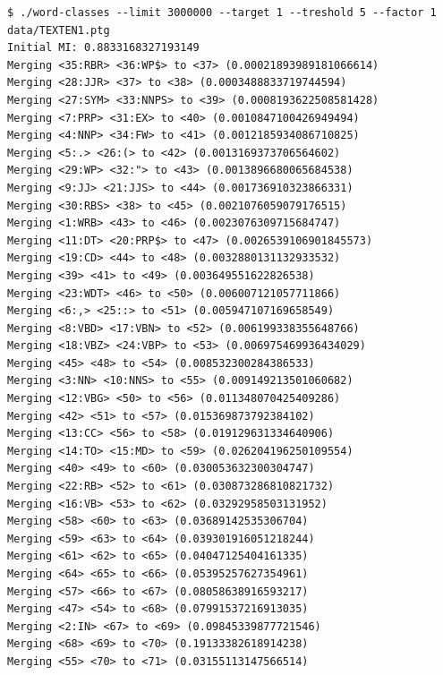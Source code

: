 \documentclass[12pt,a4paper]{article}
\begin{document}
\begin{verbatim}
$ ./word-classes --limit 3000000 --target 1 --treshold 5 --factor 1 data/TEXTEN1.ptg
Initial MI: 0.8833168327193149
Merging <35:RBR> <36:WP$> to <37> (0.00021893989181066614)
Merging <28:JJR> <37> to <38> (0.0003488833719744594)
Merging <27:SYM> <33:NNPS> to <39> (0.0008193622508581428)
Merging <7:PRP> <31:EX> to <40> (0.0010847100426949494)
Merging <4:NNP> <34:FW> to <41> (0.0012185934086710825)
Merging <5:.> <26:(> to <42> (0.0013169373706564602)
Merging <29:WP> <32:"> to <43> (0.0013896680065684538)
Merging <9:JJ> <21:JJS> to <44> (0.001736910323866331)
Merging <30:RBS> <38> to <45> (0.0021076059079176515)
Merging <1:WRB> <43> to <46> (0.0023076309715684747)
Merging <11:DT> <20:PRP$> to <47> (0.0026539106901845573)
Merging <19:CD> <44> to <48> (0.0032880131132933532)
Merging <39> <41> to <49> (0.003649551622826538)
Merging <23:WDT> <46> to <50> (0.006007121057711866)
Merging <6:,> <25::> to <51> (0.005947107169658549)
Merging <8:VBD> <17:VBN> to <52> (0.006199338355648766)
Merging <18:VBZ> <24:VBP> to <53> (0.006975469936434029)
Merging <45> <48> to <54> (0.008532300284386533)
Merging <3:NN> <10:NNS> to <55> (0.009149213501060682)
Merging <12:VBG> <50> to <56> (0.011348070425409286)
Merging <42> <51> to <57> (0.015369873792384102)
Merging <13:CC> <56> to <58> (0.019129631334640906)
Merging <14:TO> <15:MD> to <59> (0.026204196250109554)
Merging <40> <49> to <60> (0.030053632300304747)
Merging <22:RB> <52> to <61> (0.030873286810821732)
Merging <16:VB> <53> to <62> (0.03292958503131952)
Merging <58> <60> to <63> (0.03689142535306704)
Merging <59> <63> to <64> (0.039301916051218244)
Merging <61> <62> to <65> (0.04047125404161335)
Merging <64> <65> to <66> (0.05395257627354961)
Merging <57> <66> to <67> (0.08058638916593217)
Merging <47> <54> to <68> (0.07991537216913035)
Merging <2:IN> <67> to <69> (0.09845339877721546)
Merging <68> <69> to <70> (0.19133382618914238)
Merging <55> <70> to <71> (0.03155113147566514)
\end{verbatim}
\end{document}
